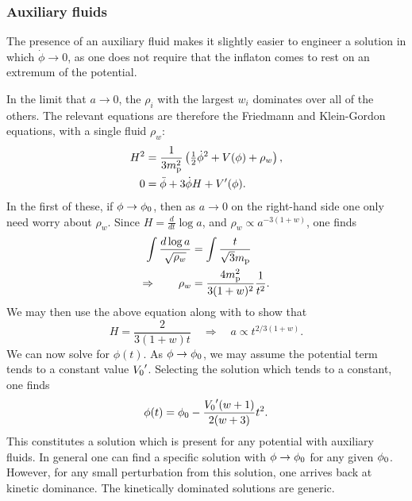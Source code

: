 \subsubsection{Auxiliary fluids}
The presence of an auxiliary fluid makes it slightly easier to
engineer a solution in which $\dot\phi\to0$, as one does not require
that the inflaton comes to rest on an extremum of the potential.

In the limit that $a\to 0$, the $\rho_i$ with the largest $w_i$
dominates over all of the others. The relevant equations are therefore
the Friedmann  and Klein-Gordon
 equations, with a single fluid $\rho_w$:
%
\begin{align}
  H^2
  &=
  \frac{1}{3m_{\mathrm{p}}^2}\left({\textstyle\frac{1}{2}}\dot{\phi}^2
  + V(\phi)
  + \rho_w \right),
  \label{eqn:Friedmann_dotphi_to_zero} \\
  0
  &=
  \ddot{\phi} +3\dot{\phi}H + V^\prime(\phi).
  \label{eqn:Klein_Gordon_dotphi_to_zero}
\end{align}
%
In the first of these, if $\phi\to\phi_0$, then as $a\to0$ on the
right-hand side one only need worry about $\rho_w$. Since
$H=\frac{d}{dt}\log a$, and $\rho_w\propto a^{-3(1+w)}$, one finds
%
\begin{align}
  \int\frac{d\log a}{\sqrt{\rho_w}}
  &=
  \int\frac{t}{\sqrt3m_{\mathrm{p}}}
  \\
  \Rightarrow \qquad \rho_w
  &=
  \frac{4m_{\mathrm{p}}^2}{3(1+w)^2} \frac{1}{t^2}.
  \label{eqn:rho_dotphi_to_zero}
\end{align}
%
We may then use the above equation along with
 to show that
%
\begin{equation}
  H = \frac{2}{3(1+w) t}
  \quad
  \Rightarrow \quad a\propto t^{2/3(1+w)}.
  \label{eqn:H_dotphi_to_zero}
\end{equation}
%
We can now solve  for $\phi(t)$.
As $\phi\to\phi_0$, we may assume the potential term tends to a
constant value ${{V_0}^\prime}$. Selecting the solution which tends to a
constant, one finds
%
\begin{equation}
  \phi(t) = \phi_0 -\frac{{{V_0}^\prime}(w+1)}{2(w+3)}t^2.
\end{equation}
%
This constitutes a solution which is present for any potential with
auxiliary fluids. In general one can find a specific solution with
$\phi\to\phi_0$ for any given $\phi_0$. However, for any small
perturbation from this solution, one arrives back at kinetic
dominance. The kinetically dominated solutions are generic. 













